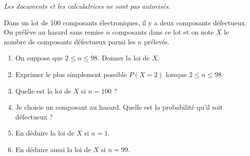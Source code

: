 \documentclass[12pt,reqno]{amsart}
\begin{document}
\ifsolutions\else
\textit{Les documents et les calculatrices ne sont pas autorisés.}
\vspace{7mm}
\fi

\begin{exo}

 Dans un lot de 100 composants électroniques, il y a deux composants défectueux. On prélève au hasard sans remise $n$ composants dans ce lot et on note $X$ le nombre de composants défectueux parmi les $n$ prélevés.
\begin{enumerate}
\item On suppose que $2 \le n \le 98.$ Donner la loi de $X.$
 \item Exprimer le plus simplement possible  $P(X=2)$ lorsque $2 \le n \le 98.$
 \item Quelle est la loi de $X$ si $n=100$ ?
 \item Je choisis un composant au hasard. Quelle est la probabilité qu'il soit défectueux ?
 \item En déduire la loi de $X$ si $n=1.$
 \item En déduire aussi la loi de $X$ si $n=99.$
\end{enumerate}


\end{exo}
\end{document}
